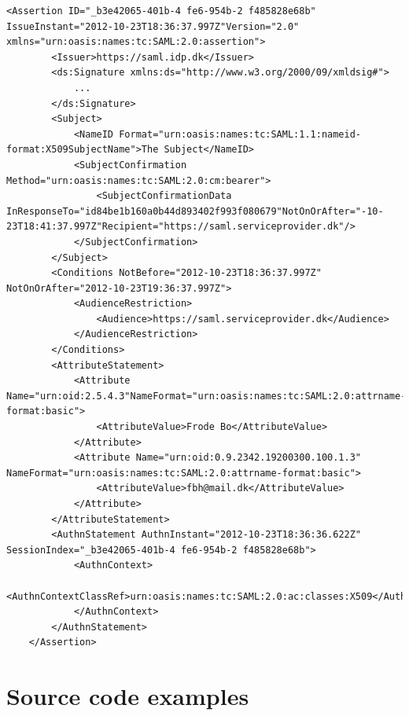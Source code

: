 \documentclass[twosided]{report}
\begin{document}
\begin{lstlisting}[style=cxml, caption={Sample SAML Assertion \cite{jacob}.}]
	<Assertion ID="_b3e42065-401b-4 fe6-954b-2 f485828e68b" IssueInstant="2012-10-23T18:36:37.997Z"Version="2.0" xmlns="urn:oasis:names:tc:SAML:2.0:assertion">
		<Issuer>https://saml.idp.dk</Issuer>
		<ds:Signature xmlns:ds="http://www.w3.org/2000/09/xmldsig#">
			...
		</ds:Signature>
		<Subject>
			<NameID Format="urn:oasis:names:tc:SAML:1.1:nameid-format:X509SubjectName">The Subject</NameID>
			<SubjectConfirmation Method="urn:oasis:names:tc:SAML:2.0:cm:bearer">
				<SubjectConfirmationData InResponseTo="id84be1b160a0b44d893402f993f080679"NotOnOrAfter="-10-23T18:41:37.997Z"Recipient="https://saml.serviceprovider.dk"/>
			</SubjectConfirmation>
		</Subject>
		<Conditions NotBefore="2012-10-23T18:36:37.997Z" NotOnOrAfter="2012-10-23T19:36:37.997Z">
			<AudienceRestriction>
				<Audience>https://saml.serviceprovider.dk</Audience>
			</AudienceRestriction>
		</Conditions>
		<AttributeStatement>
			<Attribute Name="urn:oid:2.5.4.3"NameFormat="urn:oasis:names:tc:SAML:2.0:attrname-format:basic">
				<AttributeValue>Frode Bo</AttributeValue>
			</Attribute>
			<Attribute Name="urn:oid:0.9.2342.19200300.100.1.3" NameFormat="urn:oasis:names:tc:SAML:2.0:attrname-format:basic">
				<AttributeValue>fbh@mail.dk</AttributeValue>
			</Attribute>
		</AttributeStatement>
		<AuthnStatement AuthnInstant="2012-10-23T18:36:36.622Z" SessionIndex="_b3e42065-401b-4 fe6-954b-2 f485828e68b">
			<AuthnContext>
				<AuthnContextClassRef>urn:oasis:names:tc:SAML:2.0:ac:classes:X509</AuthnContextClassRef>
			</AuthnContext>
		</AuthnStatement>
	</Assertion>
\end{lstlisting}

\chapter{Source code examples}
\label{chap:jacobcode}
\end{document}
